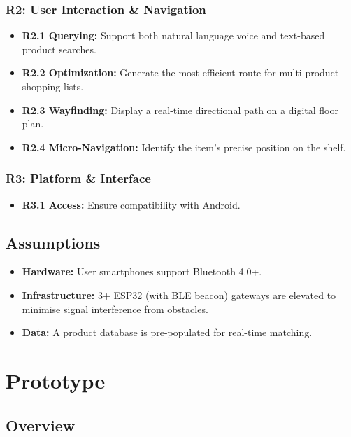 \documentclass[12pt,a4paper]{article}
\begin{document}
\subsubsection*{R2: User Interaction \& Navigation}
\begin{itemize}
    \item \textbf{R2.1 Querying:} Support both natural language voice and
    text-based product searches.
    \item \textbf{R2.2 Optimization:} Generate the most efficient route for
    multi-product shopping lists.
    \item \textbf{R2.3 Wayfinding:} Display a real-time directional path on a
    digital floor plan.
    \item \textbf{R2.4 Micro-Navigation:} Identify the item's precise position
    on the shelf.
\end{itemize}

\subsubsection*{R3: Platform \& Interface}
\begin{itemize}
    \item \textbf{R3.1 Access:} Ensure compatibility with Android.
\end{itemize}

\subsection{Assumptions}

\begin{itemize}
    \item \textbf{Hardware:} User smartphones support Bluetooth 4.0+.
    \item \textbf{Infrastructure:} 3+ ESP32 (with BLE beacon) gateways are
    elevated to minimise signal interference from obstacles.
    \item \textbf{Data:} A product database is pre-populated for real-time
    matching.
\end{itemize}

\section{Prototype}

\subsection{Overview}
\end{document}

